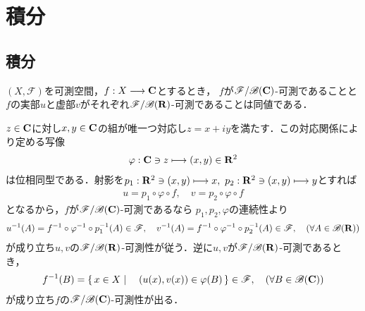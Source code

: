 \section{積分}
\subsection{積分}
	\begin{screen}
		\begin{thm}\label{thm:measurability_of_complex_measurable_functions}
			$(X,\mathscr{F})$を可測空間，$f:X \longrightarrow \mathbf{C}$とするとき，
			$f$が$\mathscr{F}/\mathscr{B}(\mathbf{C})$-可測であることと
			$f$の実部$u$と虚部$v$がそれぞれ$\mathscr{F}/\mathscr{B}(\mathbf{R})$-可測であることは同値である．
		\end{thm}
	\end{screen}
	
	\begin{prf}
		$z \in \mathbf{C}$に対し$x,y \in \mathbf{C}$の組が唯一つ対応し$z = x + i y$を満たす．この対応関係により定める写像
		\begin{align}
			\varphi:\mathbf{C} \ni z \longmapsto (x,y) \in \mathbf{R}^2
		\end{align}
		は位相同型である．射影を$p_1:\mathbf{R}^2 \ni (x,y) \longmapsto x,
		\ p_2:\mathbf{R}^2 \ni (x,y) \longmapsto y$とすれば
		\begin{align}
			u = p_1 \circ \varphi \circ f,
			\quad v = p_2 \circ \varphi \circ f
		\end{align}
		となるから，$f$が$\mathscr{F}/\mathscr{B}(\mathbf{C})$-可測であるなら
		$p_1,p_2,\varphi$の連続性より
		\begin{align}
			u^{-1}(A) = f^{-1} \circ \varphi^{-1} \circ p_1^{-1}(A) \in \mathscr{F},
			\quad v^{-1}(A) = f^{-1} \circ \varphi^{-1} \circ p_2^{-1}(A) \in \mathscr{F},
			\quad (\forall A \in \mathscr{B}(\mathbf{R}))
		\end{align}
		が成り立ち$u,v$の$\mathscr{F}/\mathscr{B}(\mathbf{R})$-可測性が従う．逆に$u,v$が$\mathscr{F}/\mathscr{B}(\mathbf{R})$-可測であるとき，
		\begin{align}
			f^{-1}(B) = \left\{\, x \in X \mid \quad (u(x),v(x)) \in \varphi(B)\, \right\} \in \mathscr{F},
			\quad (\forall B \in \mathscr{B}(\mathbf{C}))
		\end{align}
		が成り立ち$f$の$\mathscr{F}/\mathscr{B}(\mathbf{C})$-可測性が出る．
		\QED
	\end{prf}
	
	\begin{screen}
		\begin{thm}[和・積・商の可測性]
			
		\end{thm}
	\end{screen}
	
